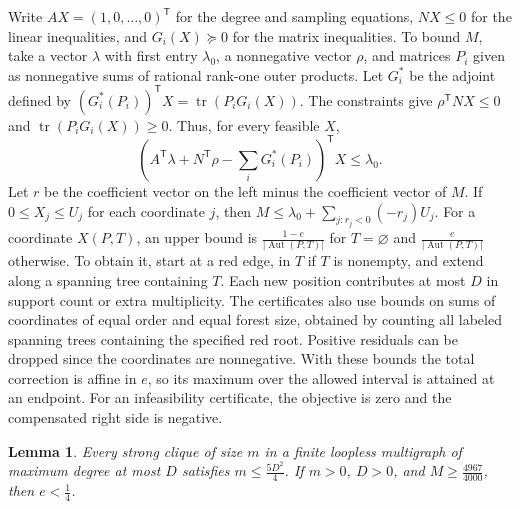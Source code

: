 \documentclass[preprint,11pt,numbers]{elsarticle-arxiv}
\numberwithin{equation}{section}
\newtheorem{lemma}[theorem]{Lemma}
\theoremstyle{definition}
\DeclareMathOperator{\tr}{tr}
\begin{document}
Write $AX=(1,0,\ldots,0)^{\mathsf T}$ for the degree and sampling
equations, $NX\le0$ for the linear inequalities, and $G_i(X)\succeq0$
for the matrix inequalities. To bound $M$, take a vector
$\lambda$ with first entry $\lambda_0$, a nonnegative vector $\rho$, and matrices $P_i$
given as nonnegative sums of rational rank-one outer products.
Let $G_i^*$ be the adjoint defined by
$(G_i^*(P_i))^{\mathsf T}X=\tr(P_iG_i(X))$. The constraints give $\rho^{\mathsf T}NX\leq0$ and
$\tr(P_iG_i(X))\geq0$. Thus, for every feasible $X$,
\[
 \left(A^{\mathsf T}\lambda+N^{\mathsf T}\rho
        -\sum_iG_i^*(P_i)\right)^{\mathsf T}X
 \le\lambda_0 .
\]
Let $r$ be the coefficient vector on the left minus the coefficient
vector of $M$. If $0\le X_j\le U_j$ for each coordinate $j$, then
$M\le\lambda_0+\sum_{j:r_j<0}(-r_j)U_j$. For a coordinate $X(P,T)$,
an upper bound is
$\frac{1-e}{|\operatorname{Aut}(P,T)|}$ for $T=\varnothing$ and
$\frac{e}{|\operatorname{Aut}(P,T)|}$ otherwise. To obtain it, start at
a red edge, in $T$ if $T$ is nonempty, and extend along a
spanning tree containing $T$. Each new position contributes at
most $D$ in support count or extra multiplicity. The certificates
also use bounds on sums of coordinates of equal order and
equal forest size, obtained by counting all labeled spanning
trees containing the specified red root. Positive residuals
can be dropped since the coordinates are nonnegative. With these bounds the total correction is affine in $e$, so
its maximum over the allowed interval is attained at an endpoint. For an infeasibility certificate, the objective
is zero and the compensated right side is negative.

\begin{lemma}\label{prop:multi-uniform}
Every strong clique of size $m$ in a finite loopless multigraph of maximum
degree at most $D$ satisfies $m\le\frac{5D^2}{4}$. If $m>0$, $D>0$, and
$M\ge\frac{4967}{4000}$,
then $e<\frac{1}{4}$.
\end{lemma}
\end{document}
